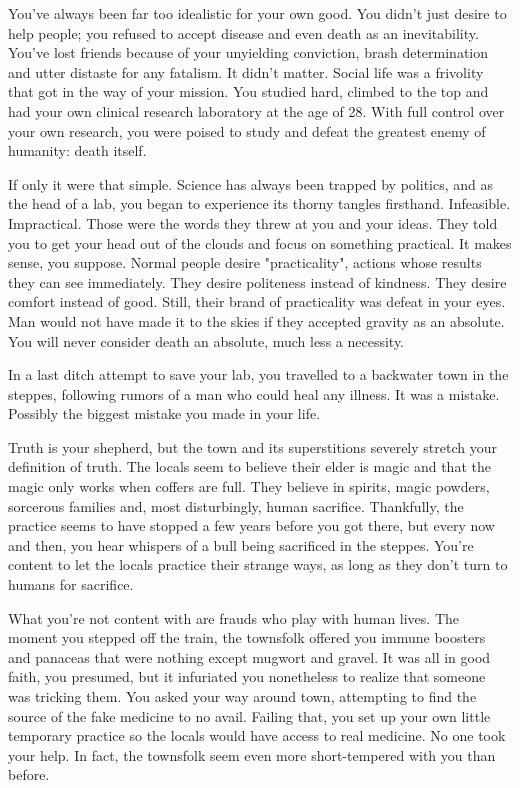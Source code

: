 \documentclass[char]{Pestilence}
\begin{document}
\name{\cOutsider{}}

You've always been far too idealistic for your own good. You didn't just desire to help people; you refused to accept disease and even death as an inevitability. You've lost friends because of your unyielding conviction, brash determination and utter distaste for any fatalism. It didn't matter. Social life was a frivolity that got in the way of your mission. You studied hard, climbed to the top and had your own clinical research laboratory at the age of 28. With full control over your own research, you were poised to study and defeat the greatest enemy of humanity: death itself.

If only it were that simple. Science has always been trapped by politics, and as the head of a lab, you began to experience its thorny tangles firsthand. Infeasible. Impractical. Those were the words they threw at you and your ideas. They told you to get your head out of the clouds and focus on something practical. It makes sense, you suppose. Normal people desire "practicality", actions whose results they can see immediately. They desire politeness instead of kindness. They desire comfort instead of good. Still, their brand of practicality was defeat in your eyes. Man would not have made it to the skies if they accepted gravity as an absolute. You will never consider death an absolute, much less a necessity.

In a last ditch attempt to save your lab, you travelled to a backwater town in the steppes, following rumors of a man who could heal any illness. It was a mistake. Possibly the biggest mistake you made in your life.

Truth is your shepherd, but the town and its superstitions severely stretch your definition of truth. The locals seem to believe their elder is magic and that the magic only works when \cElder{\their} coffers are full. They believe in spirits, magic powders, sorcerous families and, most disturbingly, human sacrifice. Thankfully, the practice seems to have stopped a few years before you got there, but every now and then, you hear whispers of a bull being sacrificed in the steppes. You're content to let the locals practice their strange ways, as long as they don't turn to humans for sacrifice.

What you're not content with are frauds who play with human lives. The moment you stepped off the train, the townsfolk offered you immune boosters and panaceas that were nothing except mugwort and gravel. It was all in good faith, you presumed, but it infuriated you nonetheless to realize that someone was tricking them. You asked your way around town, attempting to find the source of the fake medicine to no avail. Failing that, you set up your own little temporary practice so the locals would have access to real medicine. No one took your help. In fact, the townsfolk seem even more short-tempered with you than before.
\end{document}
